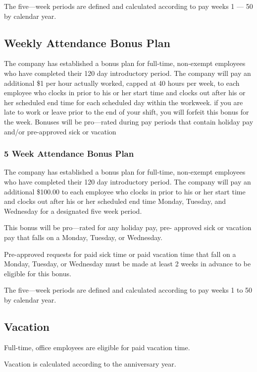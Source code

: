 The five—week periods are defined and calculated according to pay weeks 1 — 50 by calendar year.

\subsection{Weekly Attendance Bonus Plan}

The company has established a bonus plan for full-time, non-exempt employees who have completed their 120 day introductory period. The company will pay an additional \$1 per hour actually worked, capped at 40 hours per week, to each employee who clocks in prior to his or her start time and clocks out after his or her scheduled end time for each scheduled day within the workweek. if you are late to work or leave prior to the end of your shift, you will forfeit this bonus for the week. Bonuses will be pro—rated during pay periods that contain holiday pay and/or pre-approved sick or vacation

\subsubsection{5 Week Attendance Bonus Plan}

The company has established a bonus plan for full-time, non-exempt employees who have completed their 120 day introductory period. The company will pay an additional \$100.00 to each employee who clocks in prior to his or her start time and clocks out after his or her scheduled end time Monday, Tuesday, and Wednesday for a designated five week period.

This bonus will be pro—rated for any holiday pay, pre- approved sick or vacation pay that falls on a Monday, Tuesday, or Wednesday.

Pre-approved requests for paid sick time or paid vacation time that fall on a Monday, Tuesday, or Wednesday must be made at least 2 weeks in advance to be eligible for this bonus.

The five—week periods are defined and calculated according to pay weeks 1 to 50 by calendar year.

\subsection{Vacation}

Full-time, office employees are eligible for paid vacation time.

Vacation is calculated according to the anniversary year.

